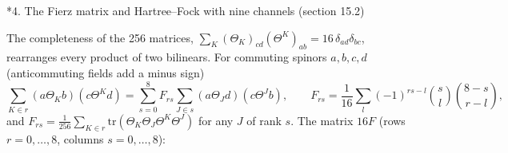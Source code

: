 \documentclass[10pt,a4paper]{article}
\makeatletter
\renewcommand\section{\@startsection{section}{1}{\z@}{-3.5ex \@plus -1ex \@minus -.2ex}{2.3ex \@plus.2ex}{\normalfont\Large\bfseries\raggedright}}
\makeatother
\begin{document}
\section*{4. The Fierz matrix and Hartree–Fock with nine channels (section 15.2)}
The completeness of the 256 matrices, $\sum_K(\Theta_K)_{cd}(\Theta^K)_{ab}=16\,\delta_{ad}\delta_{bc}$, rearranges every product of two bilinears. For commuting spinors $a,b,c,d$ (anticommuting fields add a minus sign)
\begin{equation*}
\sum_{K\in r}(a\Theta_Kb)(c\Theta^Kd)=\sum_{s=0}^{8}F_{rs}\sum_{J\in s}(a\Theta_Jd)(c\Theta^Jb),\qquad F_{rs}=\frac1{16}\sum_{l}(-1)^{rs-l}\binom{s}{l}\binom{8-s}{r-l},
\end{equation*}
and $F_{rs}=\frac1{256}\sum_{K\in r}\mathrm{tr}(\Theta_K\Theta_J\Theta^K\Theta^J)$ for any $J$ of rank $s$. The matrix $16F$ (rows $r=0,\dots,8$, columns $s=0,\dots,8$):
\end{document}
